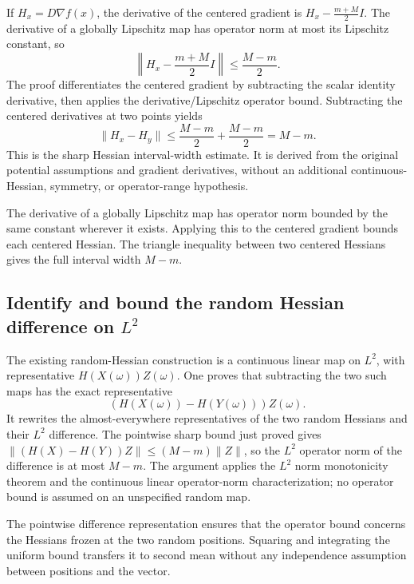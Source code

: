 \documentclass[11pt,a4paper]{report}
\begin{document}
If \(H_x=D\nabla f(x)\), the derivative of the centered gradient is \(H_x-\frac{m+M}{2}I\). The derivative of a globally Lipschitz map has operator norm at most its Lipschitz constant, so \[\left\|H_x-\frac{m+M}{2}I\right\|\le\frac{M-m}{2}.\] The proof differentiates the centered gradient by subtracting the scalar identity derivative, then applies the derivative/\allowbreak{}Lipschitz operator bound. Subtracting the centered derivatives at two points yields \[\|H_x-H_y\|\le\frac{M-m}{2}+\frac{M-m}{2}=M-m.\] This is the sharp Hessian interval-width estimate. It is derived from the original potential assumptions and gradient derivatives, without an additional continuous-Hessian, symmetry, or operator-range hypothesis.



The derivative of a globally Lipschitz map has operator norm bounded by the same constant wherever it exists. Applying this to the centered gradient bounds each centered Hessian. The triangle inequality between two centered Hessians gives the full interval width \(M-m\).

\subsection{\texorpdfstring{Identify and bound the random Hessian difference on \(L^{2}\)}{Identify and bound the random Hessian difference on L²}}
\label{report-step-KineticLangevin-HessianDifference-lean-3}


The existing random-Hessian construction is a continuous linear map on \(L^{2}\), with representative \(H(X(\omega))Z(\omega)\). One proves that subtracting the two such maps has the exact representative \[(H(X(\omega))-H(Y(\omega)))Z(\omega).\] It rewrites the almost-everywhere representatives of the two random Hessians and their \(L^{2}\) difference. The pointwise sharp bound just proved gives \(\|(H(X)-H(Y))Z\|\le(M-m)\|Z\|\), so the \(L^{2}\) operator norm of the difference is at most \(M-m\). The argument applies the \(L^{2}\) norm monotonicity theorem and the continuous linear operator-norm characterization; no operator bound is assumed on an unspecified random map.



The pointwise difference representation ensures that the operator bound concerns the Hessians frozen at the two random positions. Squaring and integrating the uniform bound transfers it to second mean without any independence assumption between positions and the vector.
\end{document}
